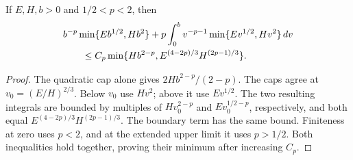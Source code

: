 \begin{lemma}\label{lem:v100-layer}
If $E,H,b>0$ and $1/2<p<2$, then
\begin{align}
 &b^{-p}\min\{E b^{1/2},H b^2\}
   +p\int_0^b v^{-p-1}\min\{E v^{1/2},H v^2\}\,dv\notag\\
 &\qquad\le C_p\min\{H b^{2-p},
                 E^{(4-2p)/3}H^{(2p-1)/3}\}.
                                                   \label{eq:v100-layer}
\end{align}
\end{lemma}
\begin{proof}
The quadratic cap alone gives $2H b^{2-p}/(2-p)$.
The caps agree at $v_0=(E/H)^{2/3}$. Below $v_0$ use $Hv^2$;
above it use $Ev^{1/2}$. The two resulting integrals are bounded by
multiples of $Hv_0^{2-p}$ and $Ev_0^{1/2-p}$, respectively, and
both equal $E^{(4-2p)/3}H^{(2p-1)/3}$. The boundary term has the
same bound. Finiteness at zero uses $p<2$, and at the extended
upper limit it uses $p>1/2$. Both inequalities hold together,
proving their minimum after increasing $C_p$.
\end{proof}

